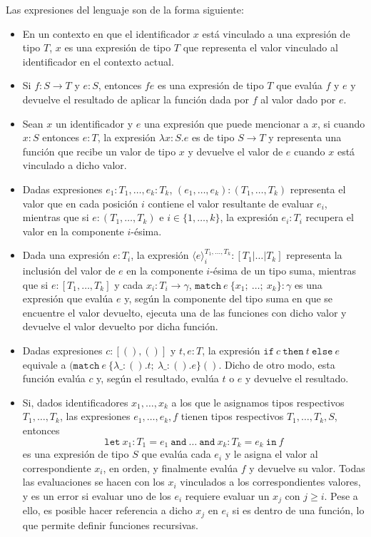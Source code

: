 Las expresiones del lenguaje son de la forma siguiente:
\begin{itemize}
\item En un contexto en que el identificador $x$ está vinculado a una expresión
  de tipo $T$, $x$ es una expresión de tipo $T$ que representa el valor
  vinculado al identificador en el contexto actual.
\item Si $f:S\to T$ y $e:S$, entonces $fe$ es una expresión de tipo $T$ que
  evalúa $f$ y $e$ y devuelve el resultado de aplicar la función dada por $f$ al
  valor dado por $e$.
\item Sean $x$ un identificador y $e$ una expresión que puede mencionar a $x$,
  si cuando $x:S$ entonces $e:T$, la expresión $\lambda x:S.e$ es de tipo
  $S\to T$ y representa una función que recibe un valor de tipo $x$ y
  devuelve el valor de $e$ cuando $x$ está vinculado a dicho valor.
\item Dadas expresiones $e_1:T_1,\dots,e_k:T_k$,
  $(e_1,\dots,e_k):(T_1,\dots,T_k)$ representa el valor que en cada posición $i$
  contiene el valor resultante de evaluar $e_i$, mientras que si
  $e:(T_1,\dots,T_k)$ e $i\in\{1,\dots,k\}$, la expresión $e_i:T_i$ recupera el
  valor en la componente $i$-ésima.
\item Dada una expresión $e:T_i$, la expresión
  $\langle e\rangle_i^{T_1,\dots,T_k}:[T_1|\dots|T_k]$ representa la inclusión
  del valor de $e$ en la componente $i$-ésima de un tipo suma, mientras que si
  $e:[T_1,\dots,T_k]$ y cada $x_i:T_i\to\gamma$,
  $\mathtt{match\ }e\mathtt{\ \{}x_1\mathtt{;\ }\dots\mathtt{;\ }x_k\mathtt{\}}:\gamma$
  es una expresión que evalúa $e$ y, según la componente
  del tipo suma en que se encuentre el valor devuelto, ejecuta una de las
  funciones con dicho valor y devuelve el valor devuelto por dicha función.
\item Dadas expresiones $c:[(),()]$ y $t,e:T$, la expresión
  $\mathtt{if\ }c\mathtt{\ then\ }t\mathtt{\ else\ }e$ equivale a
  $(\mathtt{match\ }e\mathtt{\ \{}\lambda\_:().t\mathtt{;\ }\lambda\_:().e\mathtt{\}}()$.
  Dicho de otro modo, esta función evalúa $c$ y, según el resultado, evalúa $t$
  o $e$ y devuelve el resultado.
\item Si, dados identificadores $x_1,\dots,x_k$ a los que le asignamos tipos
  respectivos $T_1,\dots,T_k$, las expresiones $e_1,\dots,e_k,f$ tienen tipos
  respectivos $T_1,\dots,T_k,S$, entonces
  \[
    \mathtt{let\ }x_1:T_1=e_1\mathtt{\ and\ }\dots\mathtt{\ and\ }x_k:T_k=e_k\mathtt{\ in\ }f
  \]
  es una expresión de tipo $S$ que evalúa cada $e_i$ y le asigna el valor al
  correspondiente $x_i$, en orden, y finalmente evalúa $f$ y devuelve su
  valor. Todas las evaluaciones se hacen con los $x_i$ vinculados a los
  correspondientes valores, y es un error si evaluar uno de los $e_i$ requiere
  evaluar un $x_j$ con $j\geq i$. Pese a ello, es posible hacer referencia a
  dicho $x_j$ en $e_i$ si es dentro de una función, lo que permite definir
  funciones recursivas.
\end{itemize}

